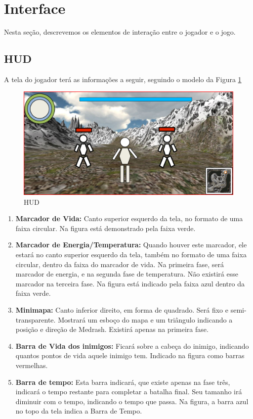 \section{Interface}

Nesta seção, descrevemos os elementos de interação entre o jogador e o
jogo.

\subsection{HUD}

A tela do jogador terá as informações a seguir, seguindo o modelo da
Figura \ref{fig:hud}
\begin{figure}[!ht]
 \centering
 \includegraphics[scale=0.59]{hud.png}
 \caption{HUD}
 \label{fig:hud}
\end{figure}
\begin{enumerate}
 \item {\bf Marcador de Vida:} Canto superior esquerdo da tela, no 
formato de uma faixa circular. Na figura está demonstrado pela faixa
verde.
 \item {\bf Marcador de Energia/Temperatura:} Quando houver este marcador,
ele estará no canto superior esquerdo da tela, também no formato
de uma faixa circular, dentro da faixa do marcador de vida. Na primeira
fase, será marcador de energia, e na segunda fase de temperatura. Não
existirá esse marcador na terceira fase.
Na figura está indicado pela faixa azul dentro da faixa verde. 
 \item {\bf Minimapa:} Canto inferior direito, em forma de quadrado.
Será fixo e semi-transparente. Mostrará um esboço do mapa e um triângulo
indicando a posição e direção de Medrash. Existirá apenas na primeira fase.
 \item {\bf Barra de Vida dos inimigos:} Ficará sobre a cabeça do inimigo,
indicando quantos pontos de vida aquele inimigo tem. Indicado na figura
como barras vermelhas.
 \item {\bf Barra de tempo:} Esta barra indicará, que existe apenas na 
fase três, indicará o tempo restante para completar a batalha final.
Seu tamanho irá diminuir com o tempo, indicando o tempo que passa. Na 
figura, a barra azul no topo da tela indica a Barra de Tempo.
\end{enumerate}


